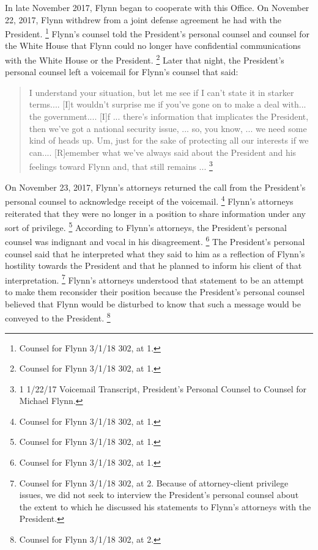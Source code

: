 In late November 2017, Flynn began to cooperate with this Office.
On November 22, 2017, Flynn withdrew from a joint defense agreement he had with the President.%
\footnote{Counsel for Flynn 3/1/18 302, at 1.}
Flynn's counsel told the President's personal counsel and counsel for the White House that Flynn could no longer have confidential communications with the White House or the President.%
\footnote{Counsel for Flynn 3/1/18 302, at 1.}
Later that night, the President's personal counsel left a voicemail for Flynn's counsel that said:

\begin{quote}
I understand your situation, but let me see if I can't state it in starker terms....
[I]t wouldn't surprise me if you've gone on to make a deal with...
the government....
[I]f ... there's information that implicates the President, then we've got a national security issue, ...
so, you know, ... we need some kind of heads up.
Um, just for the sake of protecting all our interests if we can....
[R]emember what we've always said about the President and his feelings toward Flynn and, that still remains ... %
\footnote{1 1/22/17 Voicemail Transcript, President’s Personal Counsel to Counsel for Michael Flynn.}
\end{quote}

On November 23, 2017, Flynn's attorneys returned the call from the President's personal counsel to acknowledge receipt of the voicemail.%
\footnote{Counsel for Flynn 3/1/18 302, at 1.}
Flynn's attorneys reiterated that they were no longer in a position to share information under any sort of privilege.%
\footnote{Counsel for Flynn 3/1/18 302, at 1.}
According to Flynn's attorneys, the President's personal counsel was indignant and vocal in his disagreement.%
\footnote{Counsel for Flynn 3/1/18 302, at 1.}
The President's personal counsel said that he interpreted what they said to him as a reflection of Flynn's hostility towards the President and that he planned to inform his client of that interpretation.%
\footnote{Counsel for Flynn 3/1/18 302, at 2.
Because of attorney-client privilege issues, we did not seek to interview the President’s personal counsel about the extent to which he discussed his statements to Flynn’s attorneys with the President.}
Flynn's attorneys understood that statement to be an attempt to make them reconsider their position because the President's personal counsel believed that Flynn would be disturbed to know that such a message would be conveyed to the President.%
\footnote{Counsel for Flynn 3/1/18 302, at 2.}

